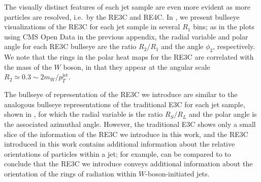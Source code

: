 The visually distinct features of each jet sample are even more evident as more particles are resolved, i.e.~by the RE3C and RE4C.
%
In , we present bullseye visualizations of the RE3C for each jet sample in several \(R_1\) bins;
%
as in the plots using CMS Open Data in the previous appendix, the radial variable and polar angle for each RE3C bullseye are the ratio \(R_2/R_1\) and the angle \(\phi_2\), respectively.
%
We note that the rings in the polar heat maps for the RE3C are correlated with the mass of the \(W\) boson, in that they appear at the angular scale \(R_2 \simeq 0.3 \sim 2 m_W / p_T^\text{jet}\).

The bullseye of representation of the RE3C we introduce are similar to the analogous bullseye representations of the traditional E3C for each jet sample, shown in , for which the radial variable is the ratio \(R_S/R_L\) and the polar angle is the associated azimuthal angle.
%
However, the traditional E3C shows only a small slice of the information of the RE3C we introduce in this work, and the RE3C introduced in this work contains additional information about the relative orientations of particles within a jet;
%
for example,  can be compared to  to conclude that the RE3C we introduce conveys additional information about the orientation of the rings of radiation within \(W\)-boson-initiated jets.

